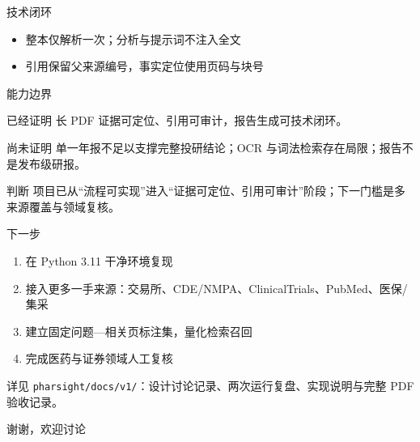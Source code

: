 \documentclass[aspectratio=169,10pt]{ctexbeamer}
\begin{document}
\begin{frame}{技术闭环}
\begin{center}
\end{center}
\vspace{0.4em}
\begin{itemize}
  \item 整本仅解析一次；分析与提示词不注入全文
  \item 引用保留父来源编号，事实定位使用页码与块号
\end{itemize}
\end{frame}

\begin{frame}{能力边界}
\begin{block}{已经证明}
长 PDF 证据可定位、引用可审计，报告生成可技术闭环。
\end{block}
\begin{alertblock}{尚未证明}
单一年报不足以支撑完整投研结论；OCR 与词法检索存在局限；报告不是发布级研报。
\end{alertblock}
\begin{exampleblock}{判断}
项目已从“流程可实现”进入“证据可定位、引用可审计”阶段；下一门槛是多来源覆盖与领域复核。
\end{exampleblock}
\end{frame}

\begin{frame}{下一步}
\begin{enumerate}
  \item 在 Python 3.11 干净环境复现
  \item 接入更多一手来源：交易所、CDE/NMPA、ClinicalTrials、PubMed、医保/集采
  \item 建立固定问题—相关页标注集，量化检索召回
  \item 完成医药与证券领域人工复核
\end{enumerate}
\vspace{0.4em}
\footnotesize 详见 \texttt{pharsight/docs/v1/}：设计讨论记录、两次运行复盘、实现说明与完整 PDF 验收记录。
\end{frame}

\begin{frame}[standout]
谢谢，欢迎讨论
\end{frame}
\end{document}
